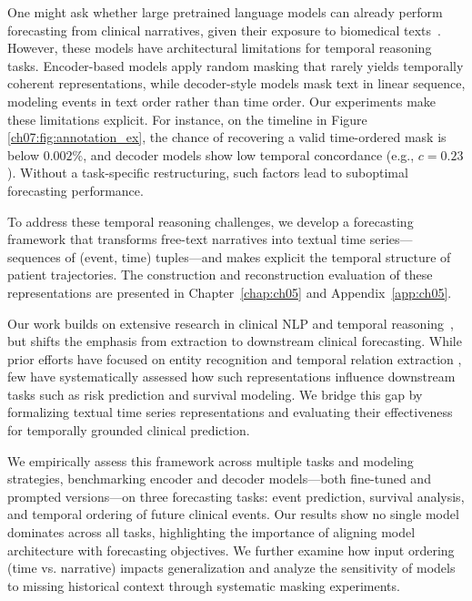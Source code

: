 One might ask whether large pretrained language models can already perform forecasting from clinical narratives, given their exposure to biomedical texts~\citep{peng2020empirical,weber2024redpajama}.
However, these models have architectural limitations for temporal reasoning tasks.
Encoder-based models apply random masking that rarely yields temporally coherent representations, while decoder-style models mask text in linear sequence, modeling events in text order rather than time order. 
Our experiments make these limitations explicit.
For instance, on the timeline in Figure \ref{ch07:fig:annotation_ex}, the chance of recovering a valid time-ordered mask is below $0.002\%$, and decoder models show low temporal concordance (e.g., $c=0.23$).
Without a task-specific restructuring, such factors lead to suboptimal forecasting performance.

To address these temporal reasoning challenges, we develop a forecasting framework that
transforms free-text narratives into textual time series---sequences of (event, time) tuples---and makes explicit the temporal structure of patient trajectories.
The construction and reconstruction evaluation of these representations are presented in Chapter~\ref{chap:ch05} and Appendix~\ref{app:ch05}.

Our work builds on extensive research in clinical NLP and temporal reasoning~\citep{kohane1987temporal,leeuwenberg2020towards,cheng2023typed}, but shifts the emphasis from extraction to downstream clinical forecasting.
While prior efforts have focused on entity recognition and temporal relation extraction \citep{zhou2007temporal,ch07:uzuner20112010,sun2013evaluating}, few have systematically assessed how such representations influence downstream tasks such as risk prediction and survival modeling.
We bridge this gap by formalizing textual time series representations and evaluating their effectiveness for temporally grounded clinical prediction.

We empirically assess this framework across multiple tasks and modeling strategies, benchmarking encoder and decoder models—both fine-tuned and prompted versions—on three forecasting tasks: event prediction, survival analysis, and temporal ordering of future clinical events.
Our results show no single model dominates across all tasks, highlighting the importance of aligning model architecture with forecasting objectives.
We further examine how input ordering (time vs. narrative) impacts generalization and analyze the sensitivity of models to missing historical context through systematic masking experiments.


